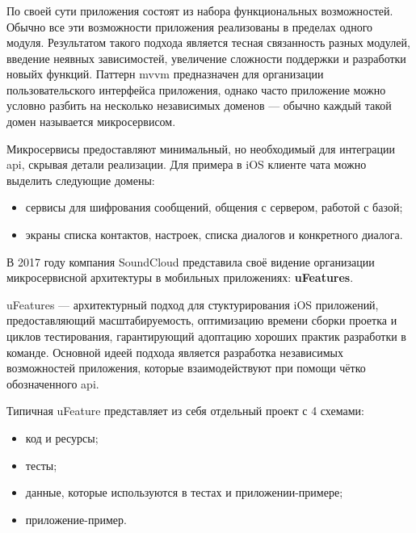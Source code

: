 \subsubsection{}
\label{sec:analysis:research:mobArch:ufeature}

По своей сути приложения состоят из набора функциональных возможностей. Обычно все эти возможности приложения реализованы в пределах одного модуля. Результатом такого подхода является тесная связанность разных модулей, введение неявных зависимостей, увеличение сложности поддержки и разработки новыйх функций. Паттерн \gls{mvvm} предназначен для организации пользовательского интерфейса приложения, однако часто приложение можно условно разбить на несколько независимых доменов --- обычно каждый такой домен называется микросервисом.

Микросервисы предоставляют минимальный, но необходимый для интеграции \gls{api}, скрывая детали реализации. Для примера в iOS клиенте чата можно выделить следующие домены:

\begin{itemize}
	\item сервисы для шифрования сообщений, общения с сервером, работой с базой;
	\item экраны списка контактов, настроек, списка диалогов и конкретного диалога.
\end{itemize}

В 2017 году компания SoundCloud представила своё видение организации микросервисной архитектуры в мобильных приложениях: \textbf{uFeatures}.

uFeatures --- архитектурный подход для стуктурирования iOS приложений, предоставляющий масштабируемость, оптимизацию времени сборки проетка и циклов тестирования, гарантирующий адоптацию хороших практик разработки в команде. Основной идеей подхода является разработка независимых возможностей приложения, которые взаимодействуют при помощи чётко обозначенного \gls{api}. \cite{soundcloud:ufeature}

Типичная uFeature представляет из себя отдельный проект с 4 схемами:

\begin{itemize}
	\item код и ресурсы;
	\item тесты;
	\item данные, которые используются в тестах и приложении-примере;
	\item приложение-пример.
\end{itemize}

